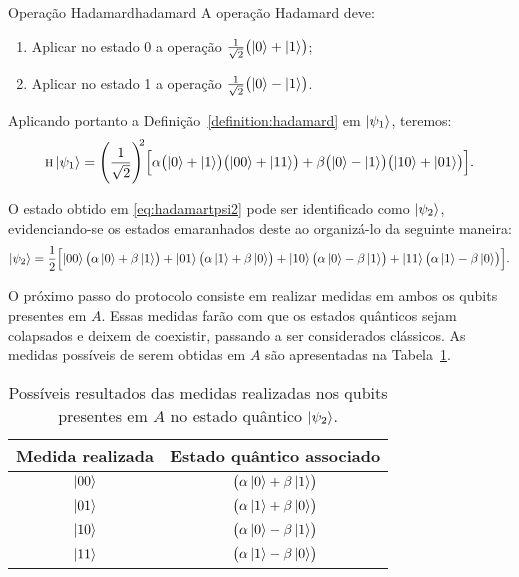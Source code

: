 \begin{definition}{Operação Hadamard}{hadamard}
  A operação Hadamard deve:
  \begin{enumerate}[label=\roman*.]
    \item Aplicar no estado 0 a operação $\frac{1}{\sqrt{2}} \bigl(\ket{0}+\ket{1}\bigr)$;
    \item Aplicar no estado 1 a operação $\frac{1}{\sqrt{2}} \bigl(\ket{0}-\ket{1}\bigr)$.
  \end{enumerate}
\end{definition}

Aplicando portanto a Definição~\ref{definition:hadamard} em $\ket{\psi_1}$, teremos:
\begin{equation}\label{eq:hadamartpsi2}
 \operatorname{\textsc{h}} \ket{\psi_1} = \Biggl( \frac{1}{\sqrt{2}}\Biggr)^{\!\!2} \Bigl[ \alpha \bigl( \ket{0} + \ket{1} \bigr)\bigl( \ket{00} +\ket{11} \bigr)+ \beta \bigl( \ket{0} - \ket{1} \bigr) \bigl( \ket{10} + \ket{01} \bigr) \Bigr].
\end{equation}

O estado obtido em \eqref{eq:hadamartpsi2} pode ser identificado como $\ket{\psi_2}$, evidenciando-se os estados emaranhados deste ao organizá-lo da seguinte maneira:
\begin{equation}\label{eq:psi2}
 \ket{\psi_2} = \frac{1}{2} \Bigl[ \ket{00} \bigl( \alpha \ket{0} + \beta \ket{1} \bigr) + \ket{01} \bigl( \alpha \ket{1} + \beta \ket{0} \bigr) + \ket{10} \bigl( \alpha \ket{0} - \beta \ket{1} \bigr) + \ket{11} \bigl( \alpha \ket{1} - \beta \ket{0} \bigr) \Bigr].
\end{equation}


O próximo passo do protocolo consiste em realizar medidas em ambos os qubits presentes em \(A\). Essas medidas farão com que os estados quânticos sejam colapsados e deixem de coexistir, passando a ser considerados clássicos. As medidas possíveis de serem obtidas em \(A\) são apresentadas na Tabela~\ref{tab:medidas}.


\begin{table}[ht!]
  \centering
  \caption{Possíveis resultados das medidas realizadas nos qubits presentes em \(A\) no estado quântico $\ket{\psi_2}$.}\label{tab:medidas}
  \begin{tabular}{cc}
    \toprule
    Medida realizada & Estado quântico associado\\
    \midrule
    $\ket{00}$   & $\bigl( \alpha \ket{0} + \beta \ket{1} \bigr)$\\
    $\ket{01}$   & $\bigl( \alpha \ket{1} + \beta \ket{0} \bigr)$\\
    $\ket{10}$   & $\bigl( \alpha \ket{0} - \beta \ket{1} \bigr)$\\
    $\ket{11}$   & $\bigl( \alpha \ket{1} - \beta \ket{0} \bigr)$\\
    \bottomrule
  \end{tabular}
\end{table}

